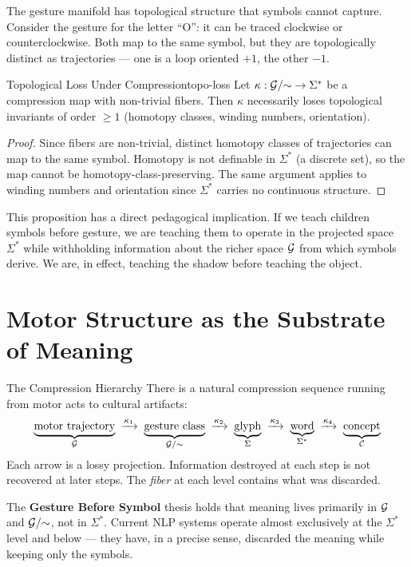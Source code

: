 The gesture manifold has topological structure that symbols cannot capture.
Consider the gesture for the letter ``O'': it can be traced clockwise or
counterclockwise. Both map to the same symbol, but they are topologically
distinct as trajectories — one is a loop oriented $+1$, the other $-1$.

\begin{proposition}{Topological Loss Under Compression}{topo-loss}
  Let $\kappa : \mathcal{G}/{\sim} \to \Sigma^*$ be a compression map with
  non-trivial fibers. Then $\kappa$ necessarily loses topological invariants
  of order $\geq 1$ (homotopy classes, winding numbers, orientation).
\end{proposition}

\begin{proof}
  Since fibers are non-trivial, distinct homotopy classes of trajectories
  can map to the same symbol. Homotopy is not definable in $\Sigma^*$
  (a discrete set), so the map cannot be homotopy-class-preserving. The
  same argument applies to winding numbers and orientation since $\Sigma^*$
  carries no continuous structure.
\end{proof}

This proposition has a direct pedagogical implication. If we teach children
symbols before gesture, we are teaching them to operate in the projected space
$\Sigma^*$ while withholding information about the richer space $\mathcal{G}$
from which symbols derive. We are, in effect, teaching the shadow before
teaching the object.

\section{Motor Structure as the Substrate of Meaning}

\begin{conceptaside}{The Compression Hierarchy}
  There is a natural compression sequence running from motor acts to
  cultural artifacts:
  \[
    \underbrace{\text{motor trajectory}}_{\mathcal{G}}
    \;\xrightarrow{\kappa_1}\;
    \underbrace{\text{gesture class}}_{\mathcal{G}/{\sim}}
    \;\xrightarrow{\kappa_2}\;
    \underbrace{\text{glyph}}_{\Sigma}
    \;\xrightarrow{\kappa_3}\;
    \underbrace{\text{word}}_{\Sigma^*}
    \;\xrightarrow{\kappa_4}\;
    \underbrace{\text{concept}}_{\mathcal{C}}
  \]
  Each arrow is a lossy projection. Information destroyed at each step is
  not recovered at later steps. The \emph{fiber} at each level contains what
  was discarded.

  \medskip
  The \textbf{Gesture Before Symbol} thesis holds that meaning lives
  primarily in $\mathcal{G}$ and $\mathcal{G}/{\sim}$, not in $\Sigma^*$.
  Current NLP systems operate almost exclusively at the $\Sigma^*$ level
  and below — they have, in a precise sense, discarded the meaning while
  keeping only the symbols.
\end{conceptaside}

